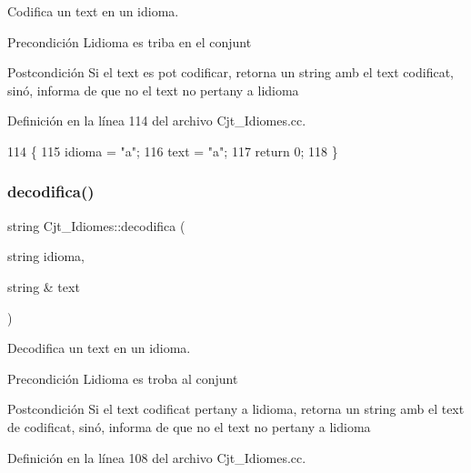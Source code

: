 Codifica un text en un idioma. 

\begin{DoxyPrecond}{Precondición}
L\textquotesingle{}idioma es triba en el conjunt 
\end{DoxyPrecond}
\begin{DoxyPostcond}{Postcondición}
Si el text es pot codificar, retorna un string amb el text codificat, sinó, informa de que no el text no pertany a l\textquotesingle{}idioma 
\end{DoxyPostcond}


Definición en la línea 114 del archivo Cjt\+\_\+\+Idiomes.\+cc.


\begin{DoxyCode}
114                                                         \{
115     idioma = \textcolor{stringliteral}{"a"};
116     text = \textcolor{stringliteral}{"a"};
117     \textcolor{keywordflow}{return} 0;
118 \}
\end{DoxyCode}
\mbox{\label{class_cjt___idiomes_ab77062c4c2b311bbc1fc1143073bc036}} 
\subsubsection{\texorpdfstring{decodifica()}{decodifica()}}
{\footnotesize\ttfamily string Cjt\+\_\+\+Idiomes\+::decodifica (\begin{DoxyParamCaption}\item[{string}]{idioma,  }\item[{string \&}]{text }\end{DoxyParamCaption})}



Decodifica un text en un idioma. 

\begin{DoxyPrecond}{Precondición}
L\textquotesingle{}idioma es troba al conjunt 
\end{DoxyPrecond}
\begin{DoxyPostcond}{Postcondición}
Si el text codificat pertany a l\textquotesingle{}idioma, retorna un string amb el text de codificat, sinó, informa de que no el text no pertany a l\textquotesingle{}idioma 
\end{DoxyPostcond}


Definición en la línea 108 del archivo Cjt\+\_\+\+Idiomes.\+cc.


